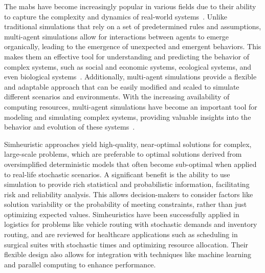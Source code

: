 The \gls{mabs} have become increasingly popular in various fields due to their ability to capture the complexity and dynamics of real-world systems~\citep{siebers-2008}. Unlike traditional simulations that rely on a set of predetermined rules and assumptions, multi-agent simulations allow for interactions between agents to emerge organically, leading to the emergence of unexpected and emergent behaviors. This makes them an effective tool for understanding and predicting the behavior of complex systems, such as social and economic systems, ecological systems, and even biological systems~\citep{ballet-2020}. Additionally, multi-agent simulations provide a flexible and adaptable approach that can be easily modified and scaled to simulate different scenarios and environments. With the increasing availability of computing resources, multi-agent simulations have become an important tool for modeling and simulating complex systems, providing valuable insights into the behavior and evolution of these systems~\citep{selvaratnam-1995}.

Simheuristic approaches yield high-quality, near-optimal solutions for complex, large-scale problems, which are preferable to optimal solutions derived from oversimplified deterministic models that often become sub-optimal when applied to real-life stochastic scenarios. A significant benefit is the ability to use simulation to provide rich statistical and probabilistic information, facilitating risk and reliability analysis. This allows decision-makers to consider factors like solution variability or the probability of meeting constraints, rather than just optimizing expected values. Simheuristics have been successfully applied in logistics for problems like vehicle routing with stochastic demands and inventory routing, and are reviewed for healthcare applications such as scheduling in surgical suites with stochastic times and optimizing resource allocation. Their flexible design also allows for integration with techniques like machine learning and parallel computing to enhance performance.

